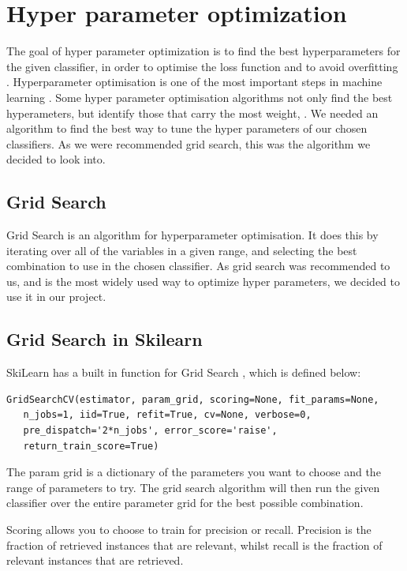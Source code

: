 \documentclass{article}
\begin{document}
\section{Hyper parameter optimization}

The goal of hyper parameter optimization is to find the best hyperparameters for the given classifier, in order to optimise the loss function and to avoid overfitting \cite{Bergstra}. Hyperparameter optimisation is one of the most important steps in machine learning \cite{bardenet}. Some hyper parameter optimisation algorithms not only find the best hyperameters, but identify those that carry the most weight, \cite{Bergstra}.
We needed an algorithm to find the best way to tune the hyper parameters of our chosen classifiers.  As we were recommended grid search, this was the algorithm we decided to look into.  

\subsection{Grid Search}

Grid Search is an algorithm for hyperparameter optimisation. It does this by iterating over all of the variables in a given range, and selecting the best combination to use in the chosen classifier. 
As grid search was recommended to us, and is the most widely used way to optimize hyper parameters, we decided to use it in our project.

\subsection{Grid Search in Skilearn}

SkiLearn has a built in function for Grid Search \cite{gridsearch}, which is defined below:


\begin{lstlisting}
GridSearchCV(estimator, param_grid, scoring=None, fit_params=None, 
   n_jobs=1, iid=True, refit=True, cv=None, verbose=0, 
   pre_dispatch='2*n_jobs', error_score='raise',
   return_train_score=True)
\end{lstlisting}

The param \textunderscore grid is a dictionary of the parameters you want to choose and the range of parameters to try. The grid search algorithm will then run the given classifier over the entire parameter grid for the best possible combination. 

Scoring allows you to choose to train for precision or recall. Precision is the fraction of retrieved instances that are relevant, whilst recall is the fraction of relevant instances that are retrieved.
\end{document}
